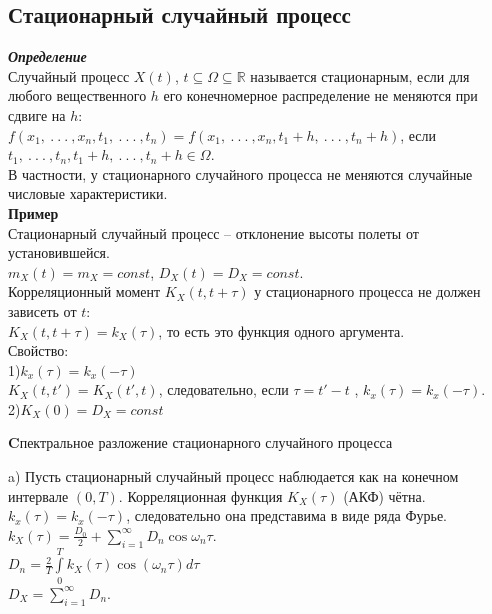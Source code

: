 \documentclass[russian, 12pt, fleqn,x11names]{article}
\begin{document}
\subsection{Стационарный случайный процесс}
\noindent
\textit{\textbf{Определение}}\\ 
Случайный процесс $X(t)$, $t \subseteq \Omega \subseteq $\(\mathbb{R}\) называется стационарным, если для любого вещественного $h$ его конечномерное распределение не меняются при сдвиге на $h$:\\
$f(x_1,\ .\ .\ .\ ,x_n, t_1,\ .\ .\ .\ ,t_n) =  f(x_1,\ .\ .\ .\ ,x_n, t_1 + h,\ .\ .\ .\ ,t_n + h)$, если $t_1,\ .\ .\ .\ , t_n, t_1 + h,\ .\ .\ .\ ,t_n + h \in \Omega$.\\
В частности, у стационарного случайного процесса не меняются случайные числовые характеристики.\\
\textbf{Пример} \\
Стационарный случайный процесс -- отклонение высоты полеты от установившейся.\\
$m_X(t) = m_X = const$, $D_X(t) = D_X = const$.\\
Корреляционный момент $K_X(t, t + \tau)$ у стационарного процесса не должен зависеть от $t$:\\
$K_X(t, t + \tau) = k_X(\tau)$, то есть это функция одного аргумента.\\
Свойство:\\
1)$k_x(\tau) = k_x(-\tau)$\\
$K_X(t, t') = K_X(t', t)$, следовательно, если $\tau = t' - t$ , $k_x(\tau) = k_x(-\tau)$.\\
2)$K_X(0) = D_X = const$\\
\begin{center}
$\textbf{Cпектральное разложение стационарного случайного процесса}$
\end{center}
a) Пусть стационарный случайный процесс наблюдается как на конечном интервале $(0, T)$. Корреляционная функция $K_X(\tau)$ (АКФ) чётна. $k_x(\tau) = k_x(-\tau)$, следовательно она представима в виде ряда Фурье.\\ $k_X(\tau) = \frac{D_0}{2} +  \displaystyle{\sum \limits_{i = 1}^{\infty}} D_n \cos \omega_n \tau$.\\
$D_n = \frac{2}{T} \displaystyle{\int \limits _{0} ^ {T}} k_X (\tau) \cos(\omega_n \tau) d\tau$\\
$D_X =   \displaystyle{\sum \limits_{i = 1}^{\infty}} D_n$.\\
\\
\end{document}
